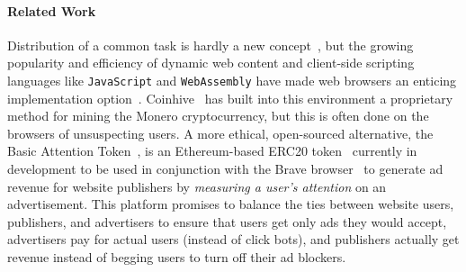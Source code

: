 \documentclass[runningheads]{llncs}
\begin{document}
\paragraph{Related Work}
Distribution of a common task is hardly a new concept~\cite{scheduling,parallel,orca}, but the growing popularity and efficiency of dynamic web content and client-side scripting languages like \verb|JavaScript| and \verb|WebAssembly|
have made web browsers an enticing implementation option~\cite{WebFlow,Duda,Cushing}.  Coinhive~\cite{coinhive} has
built into this environment a proprietary method for mining the Monero cryptocurrency, but this is often done on
the browsers of unsuspecting users.  A more ethical, open-sourced alternative, the Basic Attention Token~\cite{basicAttentionToken}, is an Ethereum-based ERC20 token~\cite{erc20} currently in development to be used in conjunction with the Brave browser~\cite{BraveBrowser} to generate ad revenue for website publishers by \emph{measuring a user's attention} on an advertisement. This platform promises to balance the ties between website users, publishers, and advertisers to ensure that users get only ads they would accept, advertisers pay for actual users (instead of click bots), and publishers actually get revenue instead of begging users to turn off their ad blockers.

\end{document}
